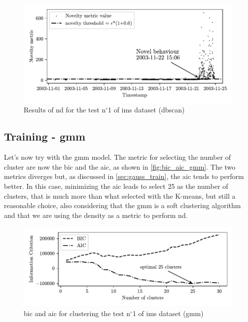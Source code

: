 \begin{figure}
    \centering
    \includegraphics{images/IMS/Novelty_01_500samples_bearing3x_dbscan.pdf}
    \caption{Results of \gls{nd} for the test $\text{n}^\circ$1 of \gls{ims} dataset (\gls{dbscan})}
    \label{fig:NoveltyScore_01_dbscan}
\end{figure}

\subsection{Training - \gls{gmm}}
Let's now try with the \gls{gmm} model. The metric for selecting the number of cluster are now the \gls{bic} and the \gls{aic}, as shown in \autoref{fig:bic_aic_gmm}. The  two metrics diverges but, as discussed in \autoref{sec:gauss_train}, the \gls{aic} tends to perform better. In this case, minimizing the \gls{aic} leads to select 25 as the number of clusters, that is much more than what selected with the K-means, but still a reasonable choice, also considering that the \gls{gmm} is a soft clustering algorithm and that we are using the density as a metric to perform \gls{nd}.

\begin{figure}
    \centering
    \includegraphics{images/IMS/BICAIC_GMM.pdf}
    \caption{\gls{bic} and \gls{aic} for clustering the test $\text{n}^\circ$1 of \gls{ims} dataset (\gls{gmm})}
    \label{fig:bic_aic_gmm}
\end{figure}

